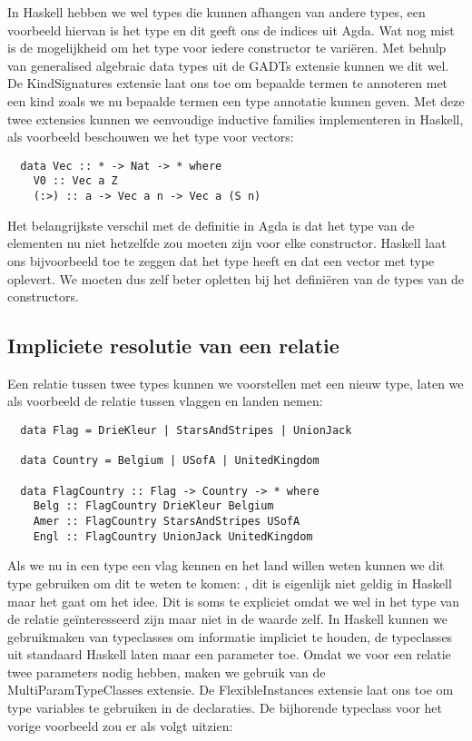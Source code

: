 In Haskell hebben we wel types die kunnen afhangen van andere types, een
voorbeeld hiervan is het  type en dit geeft ons de indices uit
Agda. Wat nog mist is de mogelijkheid om het type voor iedere constructor te
variëren. Met behulp van generalised algebraic data types uit de GADTs extensie
kunnen we dit wel. De KindSignatures extensie laat ons toe om bepaalde termen
te annoteren met een kind zoals we nu bepaalde termen een type annotatie kunnen
geven. Met deze twee extensies kunnen we eenvoudige inductive families
implementeren in Haskell, als voorbeeld beschouwen we het type voor vectors:

\begin{verbatim}
  data Vec :: * -> Nat -> * where
    V0 :: Vec a Z
    (:>) :: a -> Vec a n -> Vec a (S n)
\end{verbatim}

Het belangrijkste verschil met de definitie in Agda is dat het type van de
elementen nu niet hetzelfde zou moeten zijn voor elke constructor. Haskell laat
ons bijvoorbeeld toe te zeggen dat  het type  heeft
en dat \ihask{(:>)} een vector met type  oplevert. We
moeten dus zelf beter opletten bij het definiëren van de types van de
constructors.

\subsection{Impliciete resolutie van een relatie}

Een relatie tussen twee types kunnen we voorstellen met een nieuw type, laten
we als voorbeeld de relatie tussen vlaggen en landen nemen:

\begin{verbatim}
  data Flag = DrieKleur | StarsAndStripes | UnionJack

  data Country = Belgium | USofA | UnitedKingdom

  data FlagCountry :: Flag -> Country -> * where
    Belg :: FlagCountry DrieKleur Belgium
    Amer :: FlagCountry StarsAndStripes USofA
    Engl :: FlagCountry UnionJack UnitedKingdom
\end{verbatim}

Als we nu in een type een vlag kennen en het land willen weten kunnen we dit
type gebruiken om dit te weten te komen: , dit is eigenlijk niet geldig in Haskell maar het gaat om
het idee. Dit is soms te expliciet omdat we wel in het type van de relatie
geïnteresseerd zijn maar niet in de waarde zelf. In Haskell kunnen we
gebruikmaken van typeclasses om informatie impliciet te houden, de typeclasses
uit standaard Haskell laten maar een parameter toe. Omdat we voor een relatie
twee parameters nodig hebben, maken we gebruik van de MultiParamTypeClasses
extensie. De FlexibleInstances extensie laat ons toe om type variables te
gebruiken in de  declaraties. De bijhorende typeclass voor het
vorige voorbeeld zou er als volgt uitzien:

